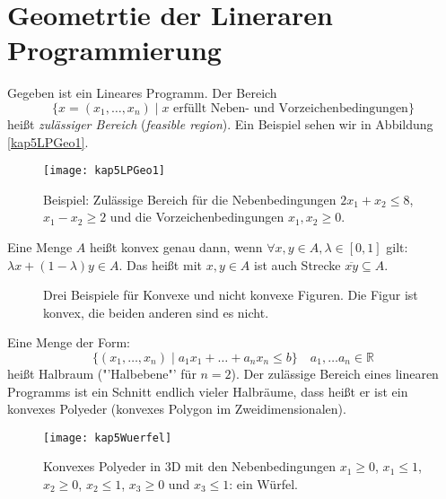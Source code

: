 \section{Geometrtie der Lineraren Programmierung}
Gegeben ist ein Lineares Programm. Der Bereich
\[ \{x = (x_1, \ldots, x_n) \mid x \text{ erfüllt Neben- und Vorzeichenbedingungen}\}\]
heißt \textit{zulässiger Bereich} (\textit{feasible region}). Ein Beispiel sehen wir in Abbildung \vref{kap5LPGeo1}.

\begin{figure}[htb]
  \centering
  \texttt{[image: kap5LPGeo1]}
  \caption{Beispiel: Zulässige Bereich für die Nebenbedingungen $2x_1 + x_2 \le 8$, $x_1 - x_2 \ge 2$ und die Vorzeichenbedingungen $x_1, x_2 \ge 0$.}
  \label{kap5LPGeo1}
\end{figure}

\begin{Def}
  \hspace{\parindent}Eine Menge $A$ heißt konvex genau dann, wenn $\forall x, y \in A, \lambda \in [0,1]$ gilt: $\lambda x + (1-\lambda) y \in A$. Das heißt mit $x, y \in A$ ist auch Strecke $\overline{xy} \subseteq A$.
\end{Def}

\begin{figure}[hbt]
  \centering
  \hspace{2em}
  \hspace{2em}
  \caption{Drei Beispiele für Konvexe und nicht konvexe Figuren. Die Figur  ist konvex, die beiden anderen sind es nicht.}
\end{figure}

\begin{Def}[Halbraum]
\hspace{\parindent}Eine Menge der Form: \[ \{ (x_1, \ldots, x_n) \mid a_1 x_1 + \ldots + a_n x_n \le b \} \quad a_1, \ldots a_n \in \mathbb{R}\] heißt Halbraum ("'Halbebene"' für $n=2$). Der zulässige Bereich eines linearen Programms ist ein Schnitt endlich vieler Halbräume, dass heißt er ist ein konvexes Polyeder (konvexes Polygon im Zweidimensionalen).
\end{Def}

\begin{figure}[htb]
  \centering
  \texttt{[image: kap5Wuerfel]}
  \caption{Konvexes Polyeder in 3D mit den Nebenbedingungen $x_1 \ge 0$, $x_1 \le 1$, $x_2 \ge 0$, $x_2 \le 1$, $x_3\ge 0$ und $x_3 \le 1$: ein Würfel.}
  \label{kap5Wuerfel}
\end{figure}

